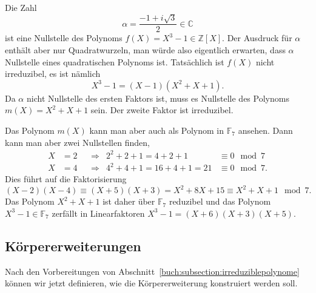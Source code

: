 \begin{beispiel}
Die Zahl 
\[
\alpha = \frac{-1+i\sqrt{3}}2\in\mathbb{C}
\]
\label{buch:endliche-koerper:eqn:1iwurzel3}
ist eine Nullstelle des Polynoms $f(X)=X^3-1\in\mathbb{Z}[X]$.
Der Ausdruck für
$\alpha$ enthält aber nur Quadratwurzeln, man würde also eigentlich
erwarten, dass $\alpha$ Nullstelle eines quadratischen Polynoms ist.
Tatsächlich ist $f(X)$ nicht irreduzibel,  es ist nämlich
\[
X^3-1 = (X-1)(X^2+X+1).
\]
Da $\alpha$ nicht Nullstelle des ersten Faktors ist, muss es Nullstelle
des Polynoms $m(X)=X^2+X+1$ sein.
Der zweite Faktor ist irreduzibel.

Das Polynom $m(X)$ kann man aber auch als Polynom in $\mathbb{F}_7$ 
ansehen.
Dann kann man aber zwei Nullstellen finden,
\[
\begin{aligned}
X&=2&&\Rightarrow& 2^2+2+1=4+2+1&\equiv 0\mod 7
\\
X&=4&&\Rightarrow& 4^2+4+1=16+4+1=21&\equiv 0\mod 7.
\end{aligned}
\]
Dies führt auf die Faktorisierung
\[
(X-2)(X-4)
\equiv
(X+5)(X+3)
=
X^2+8X+15
\equiv
X^2+X+1\mod 7.
\]
Das Polynom $X^2+X+1$ ist daher über $\mathbb{F}_7$ reduzibel und
das Polynom $X^3-1\in\mathbb{F}_7$ zerfällt in Linearfaktoren
$X^3-1=(X+6)(X+3)(X+5)$.
\end{beispiel}


\subsection{Körpererweiterungen
\label{buch:subsection:koerpererweiterungen}}
Nach den Vorbereitungen von
Abschnitt~\ref{buch:subsection:irreduziblepolynome}
können wir jetzt definieren, wie die Körpererweiterung
konstruiert werden soll.

